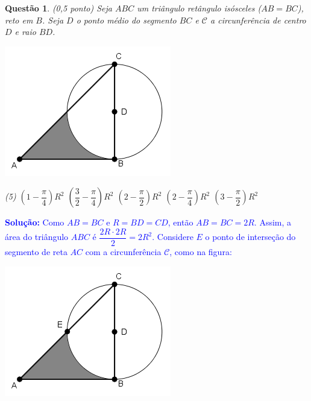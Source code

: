 \documentclass[oneside,a4paper,12pt]{article}
\newcommand{\negrito}[1]{\mbox{\boldmath{$#1$}}}
\theoremstyle{Colorido}
\theoremstyle{solu}
\theoremstyle{dotlessP}
\newcommand{\solucao}[1]{\textcolor{blue}{\textbf{Solução:} #1}}
\newtheorem{sol}{Questão}
\begin{document}
\newpage
	\begin{sol}
\textit{(0,5 ponto)}  \newline\newline
Seja $ABC$ um triângulo retângulo isósceles ($AB=BC$), reto em $B$. Seja $D$ o ponto médio do segmento $BC$ e $\mathcal{C}$ a circunferência de centro $D$ e raio $BD$.
\begin{center}
\includegraphics[scale=3.5]{Provas e Avaliações/Figuras avaliações/3avaliacaociclo3.png}
\end{center}
\begin{tasks}[counter-format={(tsk[a])},label-width=3.6ex, label-format = {\bfseries}, column-sep = {20pt}](5)
\task[\textcolor{blue}{$\negrito{(a)} $}] $\left(1 - \dfrac{\pi}{4} \right) R^2$
\task[\textcolor{blue}{$\negrito{(b)} $}] $\left(\dfrac{3}{2} - \dfrac{\pi}{4} \right) R^2$
\task[\textcolor{blue}{$\negrito{(c)} $}] $\left(2 - \dfrac{\pi}{2} \right) R^2$
\task[\textcolor{blue}{$\negrito{(d)} $}] $\left(2 - \dfrac{\pi}{4} \right) R^2$
\task[\textcolor{blue}{$\negrito{(e)} $}] $\left(3 - \dfrac{\pi}{2} \right) R^2$
\end{tasks}
\end{sol}
\solucao{Como $AB=BC$ e $R=BD=CD$, então $AB=BC=2R$. Assim, a área do triângulo $ABC$ é $\dfrac{2R \cdot 2R}{2}=2R^2$. Considere $E$ o ponto de interseção do segmento de reta $AC$ com a circunferência $\mathcal{C}$, como na figura:}
\begin{center}
\includegraphics[scale=3.5]{Provas e Avaliações/Figuras avaliações/4avaliacaociclo3.png}
\end{center}
\end{document}
